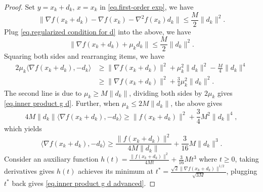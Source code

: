 \documentclass{article}
\begin{document}
\begin{proof}
    Set $y=x_k+d_k$, $x= x_k$ in \eqref{eq.first-order exp}, we have 
    \begin{equation*}
        \|\nabla f(x_k+d_k)-\nabla f(x_k)-\nabla ^2 f(x_k) d_k\| \leq \frac{M}{2}\|d_k\|^2.
    \end{equation*}
    Plug \eqref{eq.regularized condition for d} into the above, we have
    \begin{equation*}
        \|\nabla f(x_k+d_k)+\mu_k d_k\| \leq \frac{M}{2}\|d_k\|^2.
    \end{equation*}
    Squaring both sides and rearranging items, we have
    \begin{equation*}
    \begin{aligned}
        2\mu_k \langle \nabla f(x_k+d_k),-d_k \rangle &\geq \|\nabla f(x_k+d_k)\|^2 +\mu_k^2 \|d_k\|^2 -\frac{M}{4}\|d_k\|^4\\
        &\geq \|\nabla f(x_k+d_k)\|^2 +\frac{3}{4}\mu_k^2 \|d_k\|^2.
    \end{aligned}
    \end{equation*}
    The second line is due to $\mu_k\geq M\|d_k\|$, dividing both sides by $2\mu_k$ gives \eqref{eq.inner product g d}. Further, when $\mu_k \leq 2M\|d_k\|$, the above gives
    \begin{equation*}
        4M\|d_k\| \langle \nabla f(x_k+d_k),-d_k \rangle \geq \|f(x_k+d_k)\|^2 +\frac{3}{4} M^2 \|d_k\|^4,
    \end{equation*}
    which yields
    \begin{equation*}
        \langle \nabla f(x_k+d_k),-d_k \rangle \geq \frac{\|f(x_k+d_k)\|^2}{4M\|d_k\|}+\frac{3}{16}M\|d_k\|^3.
    \end{equation*}
    Consider an auxiliary function $h(t) = \frac{\|f(x_k+d_k)\|^2}{4Mt}+\frac{3}{16}Mt^3$ where $t\geq 0$, taking derivatives gives $h(t)$ achieves its minimum at $t^*= \frac{\sqrt{2}\|\nabla f(x_k+d_k)\|^{1/2}}{\sqrt{3M}}$, plugging $t^*$ back gives \eqref{eq.inner product g d advanced}.
\end{proof}

\end{document}
